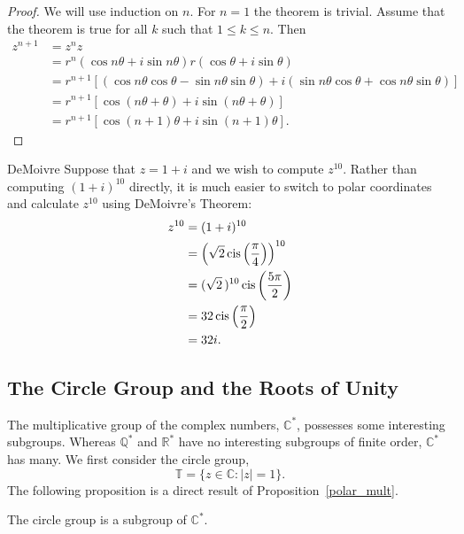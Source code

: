  
\begin{proof}
We will use induction on $n$. For $n = 1$ the theorem is trivial.
Assume that the theorem is true for all $k$ such that $1  \leq k \leq
n$. Then 
\begin{align*}
z^{n+1} & = z^n z \\
& =
r^n( \cos  n \theta + i \sin n \theta ) r( \cos \theta + i
\sin \theta ) \\
& =
r^{n+1} [( \cos n \theta \cos \theta - \sin n \theta \sin
\theta )
 + i ( \sin n \theta \cos \theta + \cos n \theta \sin \theta
)] \\
& =
r^{n+1} [ \cos( n \theta + \theta) + i \sin( n \theta +
\theta) ] \\
& =
r^{n+1} [ \cos( n +1) \theta + i \sin( n+1) \theta  ].
\end{align*}
\end{proof}
 
 
\begin{example}{DeMoivre}
Suppose that $z= 1+i$ and we wish to compute $z^{10}$. Rather than
computing $(1+i)^{10}$ directly, it is much easier to switch to polar
coordinates and calculate $z^{10}$ using DeMoivre's Theorem:
\begin{align*}
z^{10}
& =
(1+i)^{10} \\
& =
\left( \sqrt{2} \operatorname{cis} \left( \frac{\pi }{4} \right)
\right)^{10} \\
& =
( \sqrt{2}\, )^{10} \operatorname{cis} \left( \frac{5\pi }{2} \right)
\\
& =
32  \operatorname{cis} \left( \frac{\pi }{2} \right) \\
& = 32i.
\end{align*}
\end{example}
 
 
\subsection*{The Circle Group and the Roots of Unity }
 
 
The multiplicative group of the complex numbers, ${\mathbb C}^*$,
possesses some interesting subgroups.  Whereas ${\mathbb Q}^*$ and ${\mathbb
R}^*$ have no interesting subgroups of finite order, ${\mathbb C}^*$ has 
many. We first consider the {\bfi circle group}, 
\[
{\mathbb T}\label{notecirclegroup} = \{ z \in {\mathbb C} : |z| = 1 \}.
\]
The following proposition is a direct result of Proposition~\ref{polar_mult}.
 
 
\begin{proposition}
The circle group is a subgroup of  ${\mathbb C}^*$.
\end{proposition}
 
